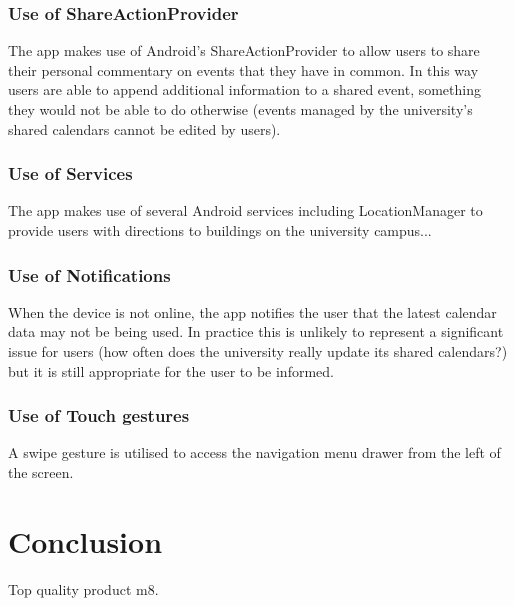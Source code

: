 \documentclass{article}
\begin{document}
\subsubsection{Use of ShareActionProvider}
The app makes use of Android's ShareActionProvider to allow users to share their personal commentary on events that they have in common. In this way users are able to append additional information to a shared event, something they would not be able to do otherwise (events managed by the university's shared calendars cannot be edited by users).
\subsubsection{Use of Services}
The app makes use of several Android services including LocationManager to provide users with directions to buildings on the university campus... 
\subsubsection{Use of Notifications}
When the device is not online, the app notifies the user that the latest calendar data may not be being used. In practice this is unlikely to represent a significant issue for users (how often does the university really update its shared calendars?) but it is still appropriate for the user to be informed.
\subsubsection{Use of Touch gestures}
A swipe gesture is utilised to access the navigation menu drawer from the left of the screen.

\section{Conclusion}
Top quality product m8.
\end{document}
